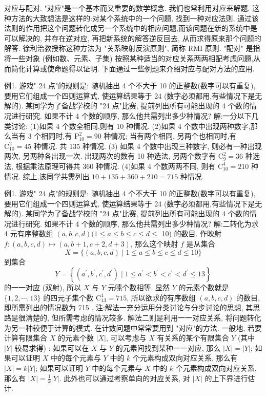 
对应与配对.
"对应"是一个基本而又重要的数学概念.
我们也常利用对应来解题.
这种方法的大致想法是这样的:对某个系统中的一个问题, 找到一种对应法则, 通过该法则的作用把这个问题转化成另一个系统中的相应问题,而该问题在新的系统中是可以解决的, 并存在逆对应, 再把新系统的解答逆反回去, 从而求得原来那个问题的解答.
徐利治教授称这种方法为 "关系映射反演原则", 简称 RMI 原则.
"配对" 是指将一些对象 (例如数、元素、子集) 按照某种适当的对应关系两两相配考虑问题,从而简化计算或使命题得以证明.
下面通过一些例题来介绍对应与配对方法的应用.



例1. 游戏" 24 点"的规则是: 随机抽出 4 个不大于 10 的正整数(数字可以有重复), 要用它们组成一个四则运算式, 使运算结果等于 24 (数字必须都用,有些情况下是无解的). 某同学为了备战学校的 "24 点"比赛, 提前列出所有可能出现的 4 个数的情况进行研究.
如果不计 4 个数的顺序, 那么他共需列出多少种情况?
解:一分以下几类讨论:
(1)如果 4 个数全相同,则有 10 种情况.
(2)如果 4 个数中出现两种数字,那么当有 3 个相同时,有 $\mathrm{P}_{10}^2=90$ 种情况; 当有两个相同, 另两个也相同时,有 $\mathrm{C}_{10}^2=45$ 种情况.
共 135 种情况.
(3) 如果 4 个数中出现三种数字, 则必有一种出现两次, 另两种各出现一次.
出现两次的数有 10 种选法, 另两个数字有 $\mathrm{C}_9^2=36$ 种选法, 根据乘法原理可得共 360 种情况.
(4)如果 4 个数两两不同, 则有 $\mathrm{C}_{10}^4=210$ 种情况.
综上,该同学共需列出 $10+135+360+210=715$ 种情况.



例1. 游戏" 24 点"的规则是: 随机抽出 4 个不大于 10 的正整数(数字可以有重复), 要用它们组成一个四则运算式, 使运算结果等于 24 (数字必须都用,有些情况下是无解的). 某同学为了备战学校的 "24 点"比赛, 提前列出所有可能出现的 4 个数的情况进行研究.
如果不计 4 个数的顺序, 那么他共需列出多少种情况?
解:二转化为求 4 元有序整数组 $(a, b, c, d)(1 \leqslant a \leqslant b \leqslant c \leqslant d \leqslant$ 10) 的数目.
作映射 $f:(a, b, c, d) \mapsto(a, b+1, c+2, d+3)$, 那么这个映射 $f$ 是从集合
$$
X=\{(a, b, c, d) \mid 1 \leqslant a \leqslant b \leqslant c \leqslant d \leqslant 10\}
$$
到集合
$$
Y=\left\{\left(a^{\prime}, b^{\prime}, c^{\prime}, d^{\prime}\right) \mid 1 \leqslant a^{\prime}<b^{\prime}<c^{\prime}<d^{\prime} \leqslant 13\right\}
$$
的一一对应 (双射), 所以 $X$ 与 $Y$ 元嗉个数相等.
显然 $Y$ 的元素个数就是 $\{1,2, \cdots, 13\}$ 的四元子集个数 $\mathrm{C}_{13}^4=715$, 所以欲求的有序数组 $(a, b, c, d)$ 的数目, 即所需列出的情况数为 715 .
注:解法一充分运用分类讨论与分步讨论的思想, 其思路是很清楚的, 但所需考虑的情况较多.
解法二则是利用一一对应关系, 将问题转化为另一种较便于计算的模式.
在计数问题中常常要用到 "对应"的方法.
一般地, 若要计算有限集合 $X$ 的元素个数 $|X|$, 可以考虑与 $X$ 有关系的某个有限集合 $Y$ (其中 $|Y|$ 较易求得) :
如果可以在 $X$ 与 $Y$ 的元素间找到某种一一对应, 那么 $|X|=|Y|$;
如果可以证明 $X$ 中的每个元素与 $Y$ 中的 $k$ 个元素构成双向对应关系, 那么有 $|X|=k|Y|$;
如果可以证明 $Y$ 中的每个元素与 $X$ 中的 $k$ 个元素构成双向对应关系, 那么有 $|X|=\frac{1}{k}|Y|$.
此外也可以通过考察单向的对应关系, 对 $|X|$ 的上下界进行估计.



